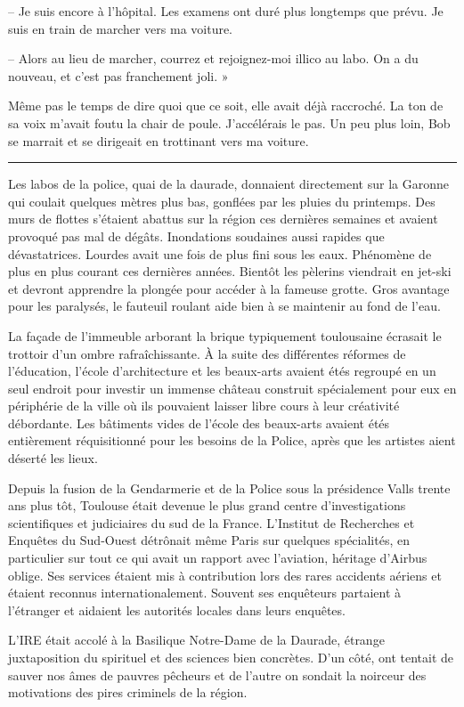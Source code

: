 -- Je suis encore à l'hôpital. Les examens ont duré plus longtemps que prévu. Je suis en train de marcher vers ma 
voiture.

-- Alors au lieu de marcher, courrez et rejoignez-moi illico au labo. On a du nouveau, et c'est pas franchement joli. »

Même pas le temps de dire quoi que ce soit, elle avait déjà raccroché. La ton de sa voix m'avait foutu la chair de 
poule. J'accélérais le pas. Un peu plus loin, Bob se marrait et se dirigeait en trottinant vers ma voiture. 

\fancybreak{$* * *$}

Les labos de la police, quai de la daurade, donnaient directement sur la Garonne qui coulait quelques mètres plus bas, 
gonflées par les pluies du printemps. Des murs de flottes s'étaient abattus sur la région ces dernières semaines et 
avaient provoqué pas mal de dégâts. Inondations soudaines aussi rapides que dévastatrices. Lourdes avait une fois de 
plus fini sous les eaux. Phénomène de plus en plus courant ces dernières années. Bientôt les pèlerins viendrait en 
jet-ski et devront apprendre la plongée pour accéder à la fameuse grotte. Gros avantage pour les paralysés, le fauteuil 
roulant aide bien à se maintenir au fond de l'eau.

La façade de l'immeuble arborant la brique typiquement toulousaine écrasait le trottoir d'un ombre rafraîchissante. À 
la suite des différentes réformes de l'éducation, l'école d'architecture et les beaux-arts avaient étés regroupé en un 
seul endroit pour investir un immense château construit spécialement pour eux en périphérie de la ville où ils pouvaient 
laisser libre cours à leur créativité débordante. Les bâtiments vides de l'école des beaux-arts avaient étés entièrement 
réquisitionné pour les besoins de la Police, après que les artistes aient déserté les lieux.

Depuis la fusion de la Gendarmerie et de la Police sous la présidence Valls trente ans plus tôt, Toulouse était devenue 
le plus grand centre d'investigations scientifiques et judiciaires du sud de la France. L'Institut de Recherches et 
Enquêtes du Sud-Ouest détrônait même Paris sur quelques spécialités, en particulier sur tout ce qui avait un rapport 
avec l'aviation, héritage d'Airbus oblige. Ses services étaient mis à contribution lors des rares accidents aériens et 
étaient reconnus internationalement. Souvent ses enquêteurs partaient à l'étranger et aidaient les autorités locales 
dans leurs enquêtes.

L'IRE était accolé à la Basilique Notre-Dame de la Daurade, étrange juxtaposition du spirituel et des sciences bien 
concrètes. D'un côté, ont tentait de sauver nos âmes de pauvres pêcheurs et de l'autre on sondait la noirceur des 
motivations des pires criminels de la région.